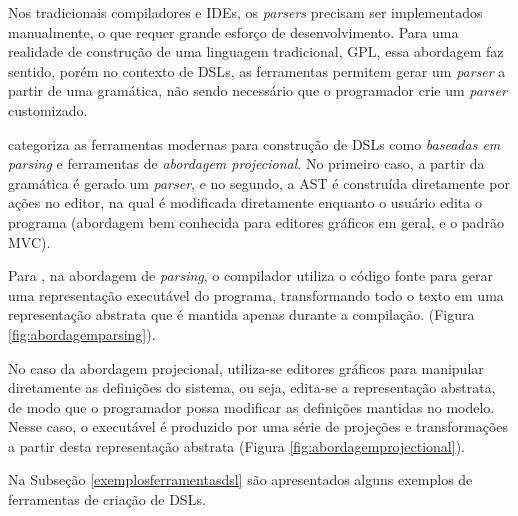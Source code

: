 Nos tradicionais compiladores e \gls{IDE}s, os \textit{parsers} precisam ser implementados manualmente, o que requer grande esforço de desenvolvimento. Para uma realidade de construção de uma linguagem tradicional, \gls{GPL}, essa abordagem faz sentido, porém no contexto de \gls{DSL}s, as ferramentas permitem gerar um \textit{parser} a partir de uma gramática, não sendo necessário que o programador crie um \textit{parser} customizado.

 categoriza as ferramentas modernas para construção de \gls{DSL}s como \textit{baseadas em parsing} e ferramentas de \textit{abordagem projecional}. No primeiro caso, a partir da gramática é gerado um \textit{parser}, e no segundo, a \gls{AST} é construída diretamente por ações no editor, na qual é modificada diretamente enquanto o usuário edita o programa (abordagem bem conhecida para editores gráficos em geral, e o padrão \gls{MVC}). 

Para , na abordagem de \textit{parsing}, o compilador utiliza o código fonte para gerar uma representação executável do programa, transformando todo o texto em uma representação abstrata que é mantida apenas durante a compilação. (Figura \ref{fig:abordagemparsing}). 



\newpage
No caso da abordagem projecional, utiliza-se editores gráficos para manipular diretamente as definições do sistema, ou seja, edita-se a representação abstrata, de modo que o programador possa modificar as definições mantidas no modelo. Nesse caso, o executável é produzido por uma série de projeções e transformações a partir desta representação abstrata (Figura \ref{fig:abordagemprojectional}).




Na Subseção \ref{exemplosferramentasdsl} são apresentados alguns exemplos de ferramentas de criação de \gls{DSL}s.

